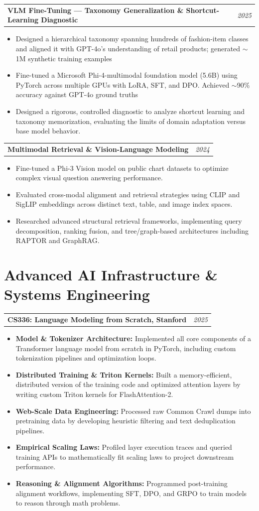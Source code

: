 \documentclass[10pt,letterpaper]{article}
\makeatletter
\newcommand{\heading}[2]{\vspace{2pt}\begin{tabularx}{\textwidth}{@{}Xr@{}}\textbf{#1} & \textit{#2}\end{tabularx}\vspace{-0pt}}
\makeatother
\begin{document}
\heading{VLM Fine-Tuning --- Taxonomy Generalization \& Shortcut-Learning Diagnostic}{2025}
\begin{itemize}
\item Designed a hierarchical taxonomy spanning hundreds of fashion-item classes and aligned it with GPT-4o's understanding of retail products; generated $\sim$1M synthetic training examples 
\item Fine-tuned a Microsoft Phi-4-multimodal foundation model (5.6B) using PyTorch across multiple GPUs with LoRA, SFT, and DPO. Achieved $\sim$90\% accuracy against GPT-4o ground truths
\item Designed a rigorous, controlled diagnostic to analyze shortcut learning and taxonomy memorization, evaluating the limits of domain adaptation versus base model behavior.
\end{itemize}

\heading{Multimodal Retrieval \& Vision-Language Modeling}{2024}
\begin{itemize}
\item Fine-tuned a Phi-3 Vision model on public chart datasets to optimize complex visual question answering performance.
\item Evaluated cross-modal alignment and retrieval strategies using CLIP and SigLIP embeddings across distinct text, table, and image index spaces.
\item Researched advanced structural retrieval frameworks, implementing query decomposition, ranking fusion, and tree/graph-based architectures including RAPTOR and GraphRAG.
\end{itemize}

\section*{Advanced AI Infrastructure \& Systems Engineering}
\heading{CS336: Language Modeling from Scratch, Stanford}{2025}
\begin{itemize}
\item \textbf{Model \& Tokenizer Architecture:} Implemented all core components of a Transformer language model from scratch in PyTorch, including custom tokenization pipelines and optimization loops.
\item \textbf{Distributed Training \& Triton Kernels:} Built a memory-efficient, distributed version of the training code and optimized attention layers by writing custom Triton kernels for FlashAttention-2.
\item \textbf{Web-Scale Data Engineering:} Processed raw Common Crawl dumps into pretraining data by developing heuristic filtering and text deduplication pipelines.
\item \textbf{Empirical Scaling Laws:} Profiled layer execution traces and queried training APIs to mathematically fit scaling laws to project downstream performance.
\item \textbf{Reasoning \& Alignment Algorithms:} Programmed post-training alignment workflows, implementing SFT, DPO, and GRPO to train models to reason through math problems.
\end{itemize}
\end{document}
